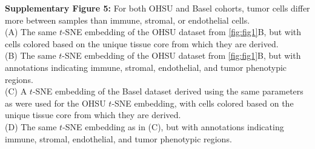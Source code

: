 \documentclass[preprint,review,3p,12pt]{elsarticle}
\begin{document}
\newpage

\noindent
\textbf{Supplementary Figure 5:} For both OHSU and Basel cohorts, tumor cells differ more between samples than immune, stromal, or endothelial cells.\\
(A) The same $t$-SNE embedding of the OHSU dataset from \autoref{fig:fig1}B, but with cells colored based on the unique tissue core from which they are derived.\\
(B) The same $t$-SNE embedding of the OHSU dataset from \autoref{fig:fig1}B, but with annotations indicating immune, stromal, endothelial, and tumor phenotypic regions.\\
(C) A $t$-SNE embedding of the Basel dataset \cite{jackson_single-cell_2020} derived using the same parameters as were used for the OHSU $t$-SNE embedding, with cells colored based on the unique tissue core from which they are derived.\\
(D) The same $t$-SNE embedding as in (C), but with annotations indicating immune, stromal, endothelial, and tumor phenotypic regions.
\end{document}
